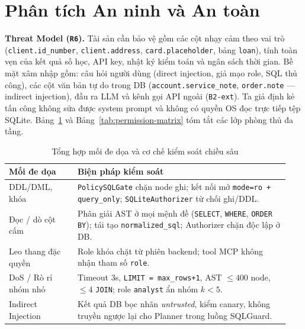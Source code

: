 \section{Phân tích An ninh và An toàn}
\label{sec:security}

\noindent \textbf{Threat Model (\texttt{R6}).} Tài sản cần bảo vệ gồm các cột nhạy cảm theo vai trò (\texttt{client.id\_number}, \texttt{client.address}, \texttt{card.placeholder}, bảng \texttt{loan}), tính toàn vẹn của kết quả số học, API key, nhật ký kiểm toán và ngân sách thời gian. Bề mặt xâm nhập gồm: câu hỏi người dùng (direct injection, giả mạo role, SQL thủ công), các cột văn bản tự do trong DB (\texttt{account.service\_note}, \texttt{order.note} --- indirect injection), đầu ra LLM và kênh gọi API ngoài (\texttt{B2-ext}). Ta giả định kẻ tấn công không sửa được system prompt và không có quyền OS đọc trực tiếp tệp SQLite. Bảng~\ref{tab:threat-controls} và Bảng~\ref{tab:permission-matrix} tóm tắt các lớp phòng thủ đa tầng.

\begin{table}[htbp]
\centering
\caption{Tổng hợp mối đe dọa và cơ chế kiểm soát chiều sâu}
\label{tab:threat-controls}
\footnotesize
\renewcommand{\arraystretch}{1.15}
\begin{tabular}{|>{\raggedright\arraybackslash}p{0.23\linewidth}|>{\raggedright\arraybackslash}p{0.71\linewidth}|}
\hline
\rowcolor{tableheader}
\textbf{Mối đe dọa} & \textbf{Biện pháp kiểm soát} \\ \hline
DDL/DML, khóa & \texttt{PolicySQLGate} chặn node ghi; kết nối mở \texttt{mode=ro + query\_only}; \texttt{SQLiteAuthorizer} từ chối ghi/DDL. \\ \hline
Đọc / dò cột cấm & Phân giải AST ở mọi mệnh đề (\texttt{SELECT}, \texttt{WHERE}, \texttt{ORDER BY}); tái tạo \texttt{normalized\_sql}; Authorizer chặn độc lập ở DB. \\ \hline
Leo thang đặc quyền & Role khóa chặt từ phiên backend; tool MCP không nhận tham số \texttt{role}. \\ \hline
DoS / Rò rỉ nhóm nhỏ & Timeout 3s, \texttt{LIMIT = max\_rows+1}, AST $\le 400$ node, $\le 4$ \texttt{JOIN}; role \texttt{analyst} ẩn nhóm $k < 5$. \\ \hline
Indirect Injection & Kết quả DB bọc nhãn \textit{untrusted}, kiểm canary, không truyền ngược lại cho Planner trong luồng SQLGuard. \\ \hline
\end{tabular}
\end{table}

